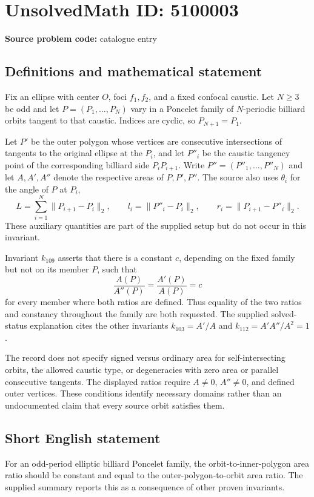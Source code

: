 \documentclass[11pt]{article}
\begin{document}
\section*{UnsolvedMath ID: 5100003}
\textbf{Source problem code:} catalogue entry
\subsection{Definitions and mathematical statement}
Fix an ellipse with center $O$, foci $f_1,f_2$, and a fixed confocal caustic. Let $N\geq3$ be odd and let $P=(P_1,\ldots,P_N)$ vary in a Poncelet family of $N$-periodic billiard orbits tangent to that caustic. Indices are cyclic, so $P_{N+1}=P_1$.

Let $P'$ be the outer polygon whose vertices are consecutive intersections of tangents to the original ellipse at the $P_i$, and let $P''_i$ be the caustic tangency point of the corresponding billiard side $P_iP_{i+1}$. Write $P''=(P''_1,\ldots,P''_N)$ and let $A,A',A''$ denote the respective areas of $P,P',P''$. The source also uses $\theta_i$ for the angle of $P$ at $P_i$,
\[
L=\sum_{i=1}^N\|P_{i+1}-P_i\|_2,\qquad
l_i=\|P''_i-P_i\|_2,\qquad r_i=\|P_{i+1}-P''_i\|_2.
\]
These auxiliary quantities are part of the supplied setup but do not occur in this invariant.

Invariant $k_{109}$ asserts that there is a constant $c$, depending on the fixed family but not on its member $P$, such that
\[
\frac{A(P)}{A''(P)}=\frac{A'(P)}{A(P)}=c
\]
for every member where both ratios are defined. Thus equality of the two ratios and constancy throughout the family are both requested. The supplied solved-status explanation cites the other invariants $k_{103}=A'/A$ and $k_{112}=A'A''/A^2=1$.

The record does not specify signed versus ordinary area for self-intersecting orbits, the allowed caustic type, or degeneracies with zero area or parallel consecutive tangents. The displayed ratios require $A\ne0$, $A''\ne0$, and defined outer vertices. These conditions identify necessary domains rather than an undocumented claim that every source orbit satisfies them.
\subsection{Short English statement}
For an odd-period elliptic billiard Poncelet family, the orbit-to-inner-polygon area ratio should be constant and equal to the outer-polygon-to-orbit area ratio. The supplied summary reports this as a consequence of other proven invariants.
\end{document}
